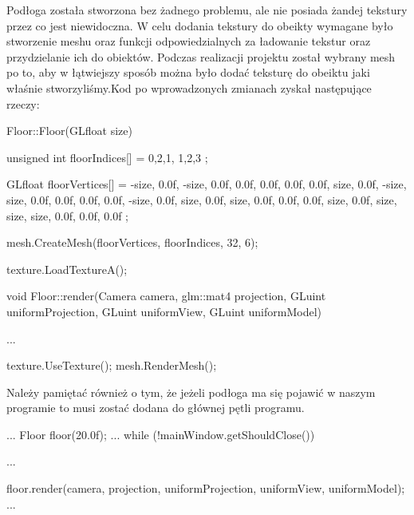 \documentclass[a4paper,12pt]{article}
\numberwithin{equation}{section}
\begin{document}
Podłoga została stworzona bez żadnego problemu, ale nie posiada żandej tekstury przez co jest niewidoczna. W celu dodania tekstury do obeikty wymagane było stworzenie meshu oraz funkcji odpowiedzialnych za ładowanie tekstur oraz przydzielanie ich do obiektów. Podczas realizacji projektu został wybrany mesh po to, aby w łątwiejszy sposób można było dodać teksturę do obeiktu jaki właśnie stworzyliśmy.Kod po wprowadzonych zmianach zyskał następujące rzeczy:
\begin{cppcode}
Floor::Floor(GLfloat size)
{
	unsigned int floorIndices[] = {
		0,2,1,
		1,2,3
	};

	GLfloat floorVertices[] = {
		-size,  0.0f, -size,   0.0f,  0.0f,   0.0f,  0.0f,  0.0f,
		 size,  0.0f, -size,  size,  0.0f,	0.0f,  0.0f,  0.0f,
		-size,  0.0f,  size,   0.0f,  size,	0.0f,  0.0f,  0.0f,
		 size,  0.0f,  size,  size,  size,  0.0f,  0.0f,  0.0f
	};

	mesh.CreateMesh(floorVertices, floorIndices, 32, 6);

	texture.LoadTextureA();
}

void Floor::render(Camera camera, glm::mat4 projection, GLuint uniformProjection, GLuint uniformView, GLuint uniformModel)
{
    ...
    
	texture.UseTexture();
	mesh.RenderMesh();
}
\end{cppcode}

Należy pamiętać również o tym, że jeżeli podłoga ma się pojawić w naszym programie to musi zostać dodana do głównej pętli programu.
\begin{cppcode}
    ...
	Floor floor(20.0f);
    ...
	while (!mainWindow.getShouldClose())
	{
    ...

		floor.render(camera, projection, uniformProjection, uniformView, uniformModel);
	...
	}
\end{cppcode}
\end{document}
